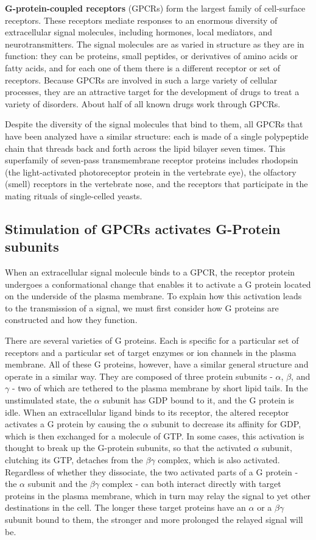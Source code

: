 \textbf{G-protein-coupled receptors} (GPCRs) form the largest family of cell-surface 
receptors. These receptors mediate responses to an enormous diversity of extracellular signal
molecules, including hormones, local mediators, and neurotransmitters.
The signal molecules are as varied in structure as they are in function:
they can be proteins, small peptides, or derivatives of amino acids or
fatty acids, and for each one of them there is a different receptor or set of
receptors. Because GPCRs are involved in such a large variety of cellular
processes, they are an attractive target for the development of drugs to
treat a variety of disorders. About half of all known drugs work through
GPCRs.

Despite the diversity of the signal molecules that bind to them, all GPCRs
that have been analyzed have a similar structure: each is made of a single 
polypeptide chain that threads back and forth across the lipid bilayer
seven times. This superfamily of seven-pass transmembrane
receptor proteins includes rhodopsin (the light-activated photoreceptor
protein in the vertebrate eye), the olfactory (smell) receptors in the vertebrate 
nose, and the receptors that participate in the mating rituals of
single-celled yeasts.

\subsection{Stimulation of GPCRs activates G-Protein subunits}

When an extracellular signal molecule binds to a GPCR, the receptor
protein undergoes a conformational change that enables it to activate a
G protein located on the underside of the plasma membrane. To explain
how this activation leads to the transmission of a signal, we must first
consider how G proteins are constructed and how they function.

There are several varieties of G proteins. Each is specific for a particular
set of receptors and a particular set of target enzymes or ion channels
in the plasma membrane. All of these G proteins, however, have a similar 
general structure and operate in a similar way. They are composed
of three protein subunits - $\alpha$, $\beta$, and $\gamma$ - two of which are tethered to the
plasma membrane by short lipid tails. In the unstimulated state, the $\alpha$
subunit has GDP bound to it, and the G protein is idle.
When an extracellular ligand binds to its receptor, the altered receptor
activates a G protein by causing the $\alpha$ subunit to decrease its affinity for
GDP, which is then exchanged for a molecule of GTP. In some cases, this
activation is thought to break up the G-protein subunits, so that the activated 
$\alpha$ subunit, clutching its GTP, detaches from the $\beta\gamma$ complex, which is
also activated. Regardless of whether they dissociate, the
two activated parts of a G protein - the $\alpha$ subunit and the $\beta\gamma$ complex -
can both interact directly with target proteins in the plasma membrane,
which in turn may relay the signal to yet other destinations in the cell.
The longer these target proteins have an $\alpha$ or a $\beta\gamma$ subunit bound to them,
the stronger and more prolonged the relayed signal will be.

